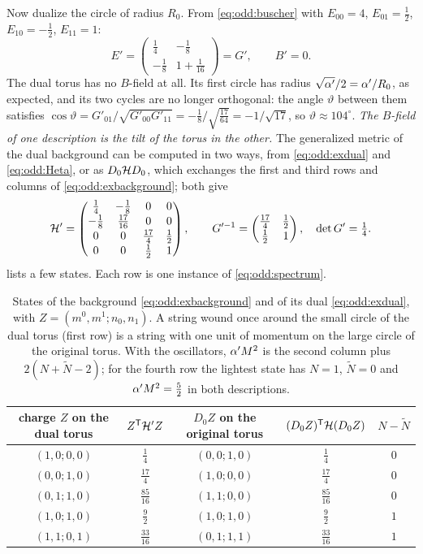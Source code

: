 Now dualize the circle of radius $R_0$. From \eqref{eq:odd:buscher} with $E_{00}=4$,
$E_{01}=\frac12$, $E_{10}=-\frac12$, $E_{11}=1$:
\begin{equation}\label{eq:odd:exdual}
 E'=\begin{pmatrix}\tfrac14&-\tfrac18\\[2pt]-\tfrac18&1+\tfrac1{16}\end{pmatrix}
 =G',\qquad B'=0 .
\end{equation}
The dual torus has no $B$-field at all. Its first circle has radius
$\sqrt{\alpha'}/2=\alpha'/R_0$, as expected, and its two cycles are no longer orthogonal: the angle
$\vartheta$ between them satisfies
$\cos\vartheta=G'_{01}/\sqrt{G'_{00}G'_{11}}=-\frac18\big/\sqrt{\tfrac{17}{64}}
=-1/\sqrt{17}$, so $\vartheta\approx104^\circ$. \emph{The $B$-field of one description is
the tilt of the torus in the other.} The generalized metric of the dual background can be
computed in two ways, from \eqref{eq:odd:exdual} and \eqref{eq:odd:Heta}, or as
$D_0\mathcal{H} D_0$, which exchanges the first and third rows and columns of
\eqref{eq:odd:exbackground}; both give
\[
 \mathcal{H}'=\begin{pmatrix}\tfrac14&-\tfrac18&0&0\\[1pt]-\tfrac18&\tfrac{17}{16}&0&0\\[1pt]
 0&0&\tfrac{17}4&\tfrac12\\[1pt]0&0&\tfrac12&1\end{pmatrix},\qquad
 G'^{-1}=\begin{pmatrix}\tfrac{17}4&\tfrac12\\[1pt]\tfrac12&1\end{pmatrix},\quad
 \det G'=\tfrac14 .
\]
 lists a few states. Each row is one instance of
\eqref{eq:odd:spectrum}.

\begin{table}[t]
\centering\small
\begin{tabular}{@{}ccccc@{}}\toprule
charge $Z$ on the dual torus & $Z^{\mathsf T}\mathcal{H}'Z$ & $D_0Z$ on the original torus &
$(D_0Z)^{\mathsf T}\mathcal{H}(D_0Z)$ & $N-\tilde N$\\\midrule
$(1,0;0,0)$ & $\frac14$ & $(0,0;1,0)$ & $\frac14$ & $0$\\[2pt]
$(0,0;1,0)$ & $\frac{17}4$ & $(1,0;0,0)$ & $\frac{17}4$ & $0$\\[2pt]
$(0,1;1,0)$ & $\frac{85}{16}$ & $(1,1;0,0)$ & $\frac{85}{16}$ & $0$\\[2pt]
$(1,0;1,0)$ & $\frac92$ & $(1,0;1,0)$ & $\frac92$ & $1$\\[2pt]
$(1,1;0,1)$ & $\frac{33}{16}$ & $(0,1;1,1)$ & $\frac{33}{16}$ & $1$\\\bottomrule
\end{tabular}
\caption{States of the background \eqref{eq:odd:exbackground} and of its dual
\eqref{eq:odd:exdual}, with $Z=(m^0,m^1;n_0,n_1)$. A string wound once around the small
circle of the dual torus (first row) is a string with one unit of momentum on the large
circle of the original torus. With the oscillators, $\alpha' M^2$ is the second column plus
$2(N+\tilde N-2)$; for the fourth row the lightest state has $N=1$, $\tilde N=0$ and
$\alpha' M^2=\frac52$ in both descriptions.}
\label{tab:odd:example}
\end{table}

